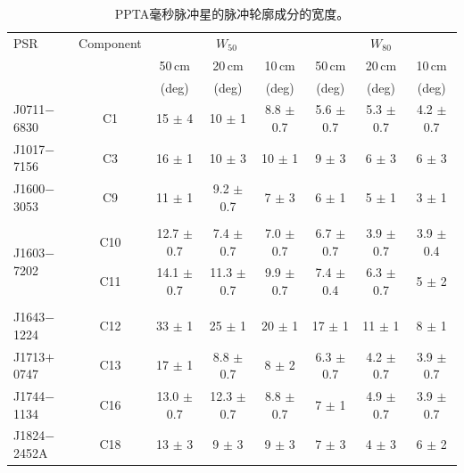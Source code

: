 \begin{landscape}
\begin{table}
\begin{center}
\caption{PPTA毫秒脉冲星的脉冲轮廓成分的宽度。}
\label{tableWidth2}
\begin{tabular}{lccccccc}
\hline
PSR                           & Component   &   \multicolumn{3}{c}{$W_{50}$}&  \multicolumn{3}{c}{$W_{80}$}     \\
								              &             & 50\,cm  & 20\,cm   & 10\,cm   & 50\,cm  & 20\,cm   & 10\,cm   \\
								              &             & (deg)   & (deg)    &  (deg)   &  (deg)  & (deg)    &   (deg)  \\
\hline
J0711$-$6830                  & C1   &15   $\pm$ 4   & 10   $\pm$ 1   & 8.8  $\pm$ 0.7  & 5.6  $\pm$ 0.7 & 5.3 $\pm$ 0.7 & 4.2 $\pm$ 0.7 \\ 
J1017$-$7156                  & C3   &16   $\pm$ 1   & 10   $\pm$ 3   & 10   $\pm$ 1    & 9    $\pm$ 3   & 6   $\pm$ 3   & 6   $\pm$ 3   \\ 
J1600$-$3053                  & C9   &11   $\pm$ 1   & 9.2  $\pm$ 0.7 & 7    $\pm$ 3    & 6    $\pm$ 1   & 5   $\pm$ 1   & 3   $\pm$ 1   \\ 
                              &      &               &                &                 &                &               &               \\
\multirow{2}{*}{J1603$-$7202} & C10  &12.7 $\pm$ 0.7 & 7.4  $\pm$ 0.7 & 7.0  $\pm$ 0.7  & 6.7  $\pm$ 0.7 & 3.9 $\pm$ 0.7 & 3.9 $\pm$ 0.4 \\  
                              & C11  &14.1 $\pm$ 0.7 & 11.3 $\pm$ 0.7 & 9.9  $\pm$ 0.7  & 7.4  $\pm$ 0.4 & 6.3 $\pm$ 0.7 & 5   $\pm$ 2   \\ 
                              &      &               &                &                 &                &               &               \\
J1643$-$1224                  & C12  &33   $\pm$ 1   & 25   $\pm$ 1   & 20   $\pm$ 1    & 17   $\pm$ 1   & 11  $\pm$ 1   & 8   $\pm$ 1   \\ 
J1713$+$0747                  & C13  &17   $\pm$ 1   & 8.8  $\pm$ 0.7 & 8    $\pm$ 2    & 6.3  $\pm$ 0.7 & 4.2 $\pm$ 0.7 & 3.9 $\pm$ 0.7 \\ 
J1744$-$1134                  & C16  &13.0 $\pm$ 0.7 & 12.3 $\pm$ 0.7 & 8.8  $\pm$ 0.7  & 7    $\pm$ 1   & 4.9 $\pm$ 0.7 & 3.9 $\pm$ 0.7 \\ 
J1824$-$2452A                 & C18  &13   $\pm$ 3   & 9    $\pm$ 3   & 9    $\pm$ 3    & 7    $\pm$ 3   & 4   $\pm$ 3   & 6   $\pm$ 2   \\ 

\end{tabular}
\end{center}
\end{table}
\end{landscape}
